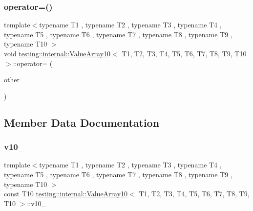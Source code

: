 \subsubsection{\texorpdfstring{operator=()}{operator=()}}
{\footnotesize\ttfamily template$<$typename T1 , typename T2 , typename T3 , typename T4 , typename T5 , typename T6 , typename T7 , typename T8 , typename T9 , typename T10 $>$ \\
void \mbox{\hyperlink{classtesting_1_1internal_1_1_value_array10}{testing\+::internal\+::\+Value\+Array10}}$<$ T1, T2, T3, T4, T5, T6, T7, T8, T9, T10 $>$\+::operator= (\begin{DoxyParamCaption}\item[{const \mbox{\hyperlink{classtesting_1_1internal_1_1_value_array10}{Value\+Array10}}$<$ T1, T2, T3, T4, T5, T6, T7, T8, T9, T10 $>$ \&}]{other }\end{DoxyParamCaption})\hspace{0.3cm}{\ttfamily [private]}}



\subsection{Member Data Documentation}
\mbox{\label{classtesting_1_1internal_1_1_value_array10_a83c1930f33030c0ea300011ad036774a}} 
\subsubsection{\texorpdfstring{v10\_}{v10\_}}
{\footnotesize\ttfamily template$<$typename T1 , typename T2 , typename T3 , typename T4 , typename T5 , typename T6 , typename T7 , typename T8 , typename T9 , typename T10 $>$ \\
const T10 \mbox{\hyperlink{classtesting_1_1internal_1_1_value_array10}{testing\+::internal\+::\+Value\+Array10}}$<$ T1, T2, T3, T4, T5, T6, T7, T8, T9, T10 $>$\+::v10\+\_\+\hspace{0.3cm}{\ttfamily [private]}}

\mbox{\label{classtesting_1_1internal_1_1_value_array10_a56c25f7677409a246f0f12833bc1274c}} 
